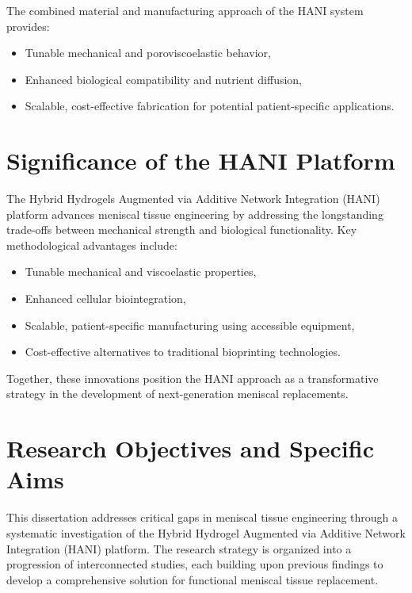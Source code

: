 The combined material and manufacturing approach of the HANI system provides:

\begin{itemize}
    \item Tunable mechanical and poroviscoelastic behavior,
    \item Enhanced biological compatibility and nutrient diffusion,
    \item Scalable, cost-effective fabrication for potential patient-specific applications.
\end{itemize}

\section{Significance of the HANI Platform}

The Hybrid Hydrogels Augmented via Additive Network Integration (HANI) platform advances meniscal tissue engineering by addressing the longstanding trade-offs between mechanical strength and biological functionality. Key methodological advantages include:

\begin{itemize}
    \item Tunable mechanical and viscoelastic properties,
    \item Enhanced cellular biointegration,
    \item Scalable, patient-specific manufacturing using accessible equipment,
    \item Cost-effective alternatives to traditional bioprinting technologies.
\end{itemize}

Together, these innovations position the HANI approach as a transformative strategy in the development of next-generation meniscal replacements. %

\section{Research Objectives and Specific Aims}

This dissertation addresses critical gaps in meniscal tissue engineering through a systematic investigation of the 
 Hybrid Hydrogel Augmented via Additive Network Integration (HANI) platform\cite{elkommos2025hybridhydrogels}. The research strategy is organized into a progression of interconnected studies, each building upon previous findings to develop a comprehensive solution for functional meniscal tissue replacement.

